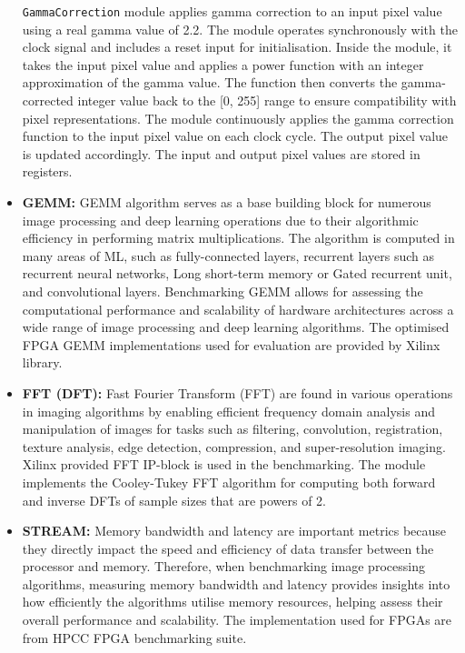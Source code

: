 \begin{itemize}
    \texttt{GammaCorrection} module applies gamma correction to an input pixel value using a real gamma value of 2.2. The module operates synchronously with the clock signal and includes a reset input for initialisation. Inside the module, it takes the input pixel value and applies a power function with an integer approximation of the gamma value. The function then converts the gamma-corrected integer value back to the [0, 255] range to ensure compatibility with pixel representations. The module continuously applies the gamma correction function to the input pixel value on each clock cycle. The output pixel value is updated accordingly. The input and output pixel values are stored in registers.
    
    \item \textbf{GEMM:} GEMM algorithm serves as a base building block for numerous image processing and deep learning operations  due to their algorithmic efficiency in performing matrix multiplications. The algorithm is computed in many areas of ML, such as fully-connected layers, recurrent layers such as recurrent neural networks, Long short-term memory or Gated recurrent unit, and convolutional layers. Benchmarking GEMM allows for assessing the computational performance and scalability of hardware architectures across a wide range of image processing and deep learning algorithms. The optimised FPGA GEMM implementations used for evaluation are provided by Xilinx\cite{AMDGEMM} library.
    
    \item \textbf{FFT (DFT):} Fast Fourier Transform (FFT) are found in various operations in imaging algorithms by enabling efficient frequency domain analysis and manipulation of images for tasks such as filtering, convolution, registration, texture analysis, edge detection, compression, and super-resolution imaging. Xilinx provided FFT IP-block\cite{AMDFFT} is used in the benchmarking. The module implements the Cooley-Tukey FFT algorithm for computing both forward and inverse DFTs of sample sizes that are powers of 2. 
    
    \item \textbf{STREAM:} Memory bandwidth and latency are important metrics because they directly impact the speed and efficiency of data transfer between the processor and memory. Therefore, when benchmarking image processing algorithms, measuring memory bandwidth and latency provides insights into how efficiently the algorithms utilise memory resources, helping assess their overall performance and scalability. The implementation used for FPGAs are from HPCC \textunderscore FPGA benchmarking suite\cite{hpcc_fpga}.
    

\end{itemize}
